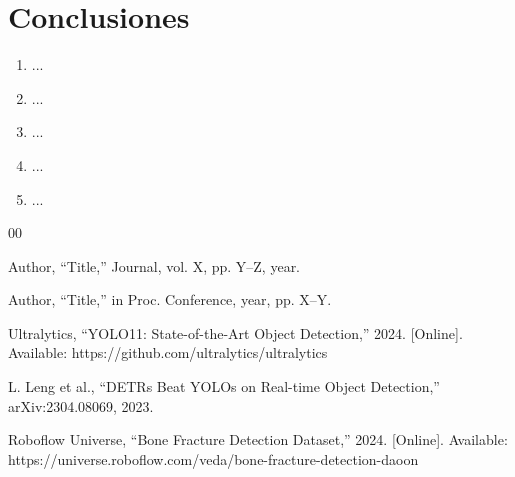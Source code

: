 ﻿\documentclass[conference]{IEEEtran}
\begin{document}

\section{Conclusiones}


\begin{enumerate}
    \item ...
    \item ...
    \item ...
    \item ...
    \item ...
\end{enumerate}

\begin{thebibliography}{00}

Author, ``Title,'' Journal, vol. X, pp. Y--Z, year.

Author, ``Title,'' in Proc. Conference, year, pp. X--Y.

Ultralytics, ``YOLO11: State-of-the-Art Object Detection,'' 2024.
[Online]. Available: https://github.com/ultralytics/ultralytics

L. Leng et al., ``DETRs Beat YOLOs on Real-time Object Detection,''
arXiv:2304.08069, 2023.

Roboflow Universe, ``Bone Fracture Detection Dataset,'' 2024.
[Online]. Available: https://universe.roboflow.com/veda/bone-fracture-detection-daoon

\end{thebibliography}
\end{document}
